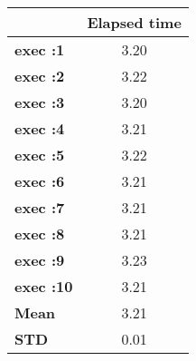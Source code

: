\begin{tiny}\begin{tabular}{|l|c|}
\hline
&\textbf{Elapsed time}\\\hline
\textbf{exec :1}&3.20\\\hline
\textbf{exec :2}&3.22\\\hline
\textbf{exec :3}&3.20\\\hline
\textbf{exec :4}&3.21\\\hline
\textbf{exec :5}&3.22\\\hline
\textbf{exec :6}&3.21\\\hline
\textbf{exec :7}&3.21\\\hline
\textbf{exec :8}&3.21\\\hline
\textbf{exec :9}&3.23\\\hline
\textbf{exec :10}&3.21\\\hline
\textbf{ Mean}&3.21\\\hline
\textbf{ STD}&0.01\\\hline
\end{tabular}
\end{tiny}